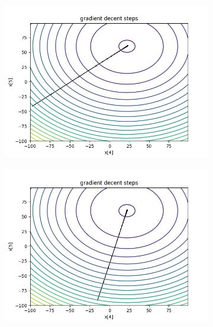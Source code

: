 	\begin{figure}[h!]
		\centering
		\begin{subfigure}[b]{0.45\linewidth}
			\includegraphics[width=\linewidth]{photos/f1_1_2.png}
		\end{subfigure}
		\begin{subfigure}[b]{0.45\linewidth}
			\includegraphics[width=\linewidth]{photos/f1_2_2.png}
		\end{subfigure}
		\begin{subfigure}[b]{0.45\linewidth}

\end{subfigure}
\end{figure}
